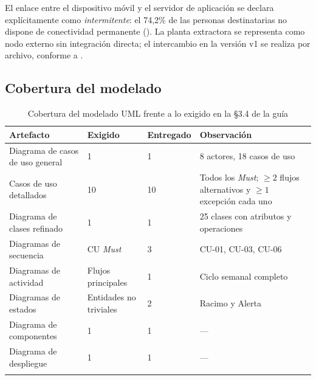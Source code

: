 \noindent
El enlace entre el dispositivo móvil y el servidor de aplicación se declara explícitamente como
\emph{intermitente}: el 74{,}2\% de las personas destinatarias no dispone de conectividad permanente
(). La planta extractora se representa como nodo externo sin integración directa; el
intercambio en la versión v1 se realiza por archivo, conforme a .

\subsection{Cobertura del modelado}

\begin{longtable}{|L{4.6cm}|C{2.2cm}|C{2.2cm}|L{5.0cm}|}
\hline
{}\textbf{Artefacto} & \textbf{Exigido} & \textbf{Entregado} & \textbf{Observación} \\
\hline
\endhead
Diagrama de casos de uso general & 1 & 1 & 8 actores, 18 casos de uso \\ \hline
Casos de uso detallados & 10 & 10 & Todos los \emph{Must}; $\geq 2$ flujos alternativos y $\geq 1$ excepción cada uno \\ \hline
Diagrama de clases refinado & 1 & 1 & 25 clases con atributos y operaciones \\ \hline
Diagramas de secuencia & CU \emph{Must} & 3 & CU-01, CU-03, CU-06 \\ \hline
Diagramas de actividad & Flujos principales & 1 & Ciclo semanal completo \\ \hline
Diagramas de estados & Entidades no triviales & 2 & Racimo y Alerta \\ \hline
Diagrama de componentes & 1 & 1 & --- \\ \hline
Diagrama de despliegue & 1 & 1 & --- \\ \hline
\caption{Cobertura del modelado UML frente a lo exigido en la §3.4 de la guía}
\end{longtable}
